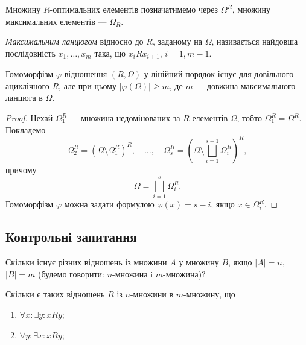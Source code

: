 Множину $R$-оптимальних елементів позначатимемо через $\Omega^R$, множину максимальних елементів --- $\Omega_R$.

\begin{definition}
	\textit{Максимальним ланцюгом} відносно до $R$, заданому на $\Omega$, називається найдовша послідовність $x_1, \ldots, x_m$ така, що $x_i R x_{i+1}$, $i = \overline{1, m - 1}$.
\end{definition}

\begin{theorem}
	Гомоморфізм $\varphi$ відношення $(R, \Omega)$ у лінійний порядок існує для довільного ациклічного $R$, але при цьому $|\varphi(\Omega)| \ge m$, де $m$ --- довжина максимального ланцюга в $\Omega$.
\end{theorem}

\begin{proof}
	Нехай $\Omega_1^R$ --- множина недомінованих за $R$ елементів $\Omega$, тобто $\Omega_1^R = \Omega^R$. Покладемо \begin{equation}\Omega_2^R = \left( \Omega \setminus \Omega_1^R \right)^R, \quad \ldots, \quad \Omega_s^R = \left( \Omega \setminus \bigsqcup\limits_{i = 1}^{s - 1} \Omega_i^R \right)^R, \end{equation} причому \begin{equation}\Omega = \bigsqcup\limits_{i = 1}^s \Omega_i^R. \end{equation} Гомоморфізм $\varphi$ можна задати формулою $\varphi(x) = s - i$, якщо $x \in \Omega_i^R$.
\end{proof}

\subsection{Контрольні запитання}

\begin{problem}
	Скільки існує різних відношень із множини $A$ у множину $B$, якщо $|A| = n$, $|B| = m$ (будемо говорити: $n$-множина i $m$-множина)?
\end{problem}

\begin{problem}
	Скільки є таких відношень $R$ із $n$-множини в $m$-множину, що
	\begin{enumerate}
		\item $\forall x: \exists y: x R y$;
		\item $\forall y: \exists x: x R y$;
	\end{enumerate}
\end{problem}

